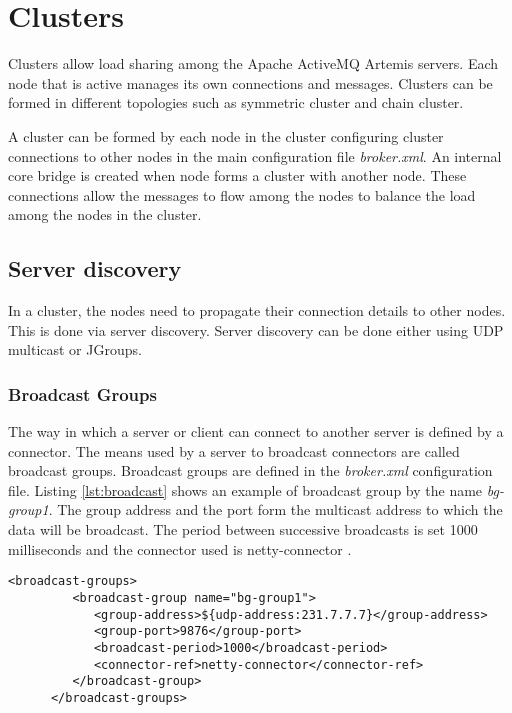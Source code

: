 
\section{Clusters}

Clusters allow load sharing among the Apache ActiveMQ Artemis servers. Each node that is active manages its own connections and messages. Clusters can be formed in different topologies such as symmetric cluster and chain cluster.

A cluster can be formed by each node in the cluster configuring cluster connections to other nodes in the main configuration file \textit{broker.xml}. An internal core bridge is created when node forms a cluster with another node. These connections allow the messages to flow among the nodes to balance the load among the nodes in the cluster. 


\subsection{Server discovery}

In a cluster, the nodes need to propagate their connection details to other nodes. This is done via server discovery. Server discovery can be done either using UDP multicast or JGroups.

\subsubsection{Broadcast Groups}

The way in which a server or client can connect to another server is defined by a connector. The means used by a server to broadcast connectors are called broadcast groups. Broadcast groups are defined in the \textit{broker.xml} configuration file. Listing \ref{lst:broadcast} shows an example of broadcast group by the name \textit{bg-group1}. The group address and the port form the multicast address to which the data will be broadcast. The period between successive broadcasts is set 1000 milliseconds and the connector used is netty-connector \parencite{netty}.

\bigskip
\begin{lstlisting}[style=XmlInputStyle,caption=Broadcast Group Example, label={lst:broadcast}]
      <broadcast-groups>
         <broadcast-group name="bg-group1">
            <group-address>${udp-address:231.7.7.7}</group-address>
            <group-port>9876</group-port>
            <broadcast-period>1000</broadcast-period>
            <connector-ref>netty-connector</connector-ref>
         </broadcast-group>
      </broadcast-groups>
\end{lstlisting}

